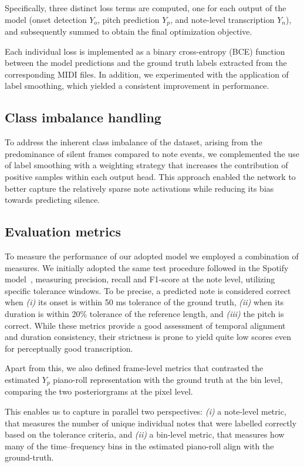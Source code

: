\documentclass[10pt,twocolumn,letterpaper]{article}
\begin{document}
Specifically, three distinct loss terms are computed, one for each output of the model (onset detection $Y_o$, pitch prediction $Y_p$, and note-level transcription $Y_n$), and subsequently summed to obtain the final optimization objective.

Each individual loss is implemented as a binary cross-entropy (BCE) function between the model predictions and the ground truth labels extracted from the corresponding MIDI files. In addition, we experimented with the application of label smoothing, which yielded a consistent improvement in performance.

\subsection{Class imbalance handling}

To address the inherent class imbalance of the dataset, arising from the predominance of silent frames compared to note events, we complemented the use of label smoothing with a weighting strategy that increases the contribution of positive samples within each output head. This approach enabled the network to better capture the relatively sparse note activations while reducing its bias towards predicting silence.

\subsection{Evaluation metrics}

To measure the performance of our adopted model we employed a combination of measures. 
We initially adopted the same test procedure followed in the Spotify model~\cite{spoty-audio}, measuring precision, recall and F1-score at the note level, utilizing specific tolerance windows. 
To be precise, a predicted note is considered correct when \textit{(i)} its onset is within \num{50} ms tolerance of the ground truth, \textit{(ii)} when its duration is within \num{20}\% tolerance of the reference length, and \textit{(iii)} the pitch is correct. 
While these metrics provide a good assessment of temporal alignment and duration consistency, their strictness is prone to yield quite low scores even for perceptually good transcription.

Apart from this, we also defined frame-level metrics that contrasted the estimated $Y_p$ piano-roll representation with the ground truth at the bin level, comparing the two posteriorgrams at the pixel level.

This enables us to capture in parallel two perspectives:
\textit{(i)} a note-level metric, that measures the number of unique individual notes that were labelled correctly based on the tolerance criteria, and 
\textit{(ii)} a bin-level metric, that measures how many of the time--frequency bins in the estimated piano-roll align with the ground-truth. 
\end{document}
